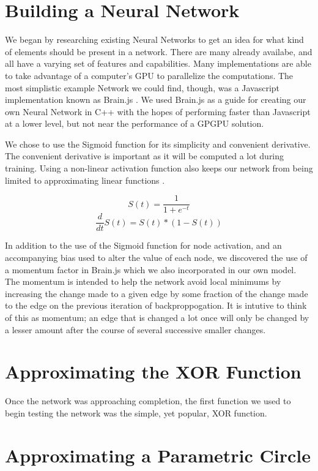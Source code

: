 \documentclass{article}
\begin{document}
\begin{multicols}{2}
\section{Building a Neural Network}

We began by researching existing Neural Networks to get an idea for what kind of elements should be present in a network. There are many already availabe, and all have a varying set of features and capabilities. Many implementations are able to take advantage of a computer's GPU to parallelize the computations. The most simplistic example Network we could find, though, was a Javascript implementation known as Brain.js \cite{brain}. We used Brain.js as a guide for creating our own Neural Network in C++ with the hopes of performing faster than Javascript at a lower level, but not near the performance of a GPGPU solution.

We chose to use the Sigmoid function for its simplicity and convenient derivative. The convenient derivative is important as it will be computed a lot during training. Using a non-linear activation function also keeps our network from being limited to approximating linear functions \cite{Hornik}.

	\[S(t) = \frac{1}{1+e^{-t}}\]
	\[\frac{d}{dt}S(t) = S(t) * (1-S(t))\]


In addition to the use of the Sigmoid function for node activation, and an accompanying bias used to alter the value of each node, we discovered the use of a momentum factor in Brain.js which we also incorporated in our own model. The momentum is intended to help the network avoid local minimums by increasing the change made to a given edge by some fraction of the change made to the edge on the previous iteration of backproppogation. It is intutive to think of this as momentum; an edge that is changed a lot once will only be changed by a lesser amount after the course of several successive smaller changes.

\section{Approximating the XOR Function}

Once the network was approaching completion, the first function we used to begin testing the network was the simple, yet popular, XOR function.

\section{Approximating a Parametric Circle}


\end{multicols}
\end{document}
